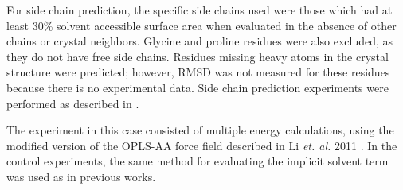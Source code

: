For side chain prediction, the specific side chains used were those which had at least 30\% solvent accessible surface area when evaluated in the absence of other chains or crystal neighbors.
Glycine and proline residues were also excluded, as they do not have free side chains.
Residues missing heavy atoms in the crystal structure were predicted; however, RMSD was not measured for these residues because there is no experimental data.
Side chain prediction experiments were performed as described in \cite{jacobson2002role}.

The experiment in this case consisted of multiple energy calculations, using the modified version of the OPLS-AA force field described in Li {\it et. al.} 2011 \cite{li2011vsgb}.
In the control experiments, the same method for evaluating the implicit solvent term was used as in previous works.

